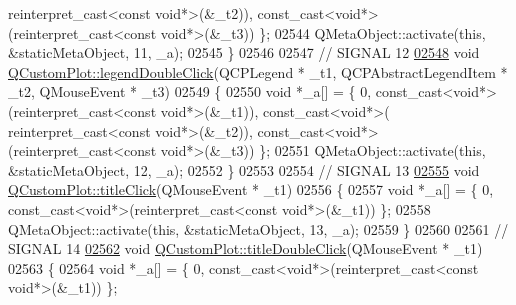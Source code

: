 \begin{DoxyCode}
{      reinterpret\_cast<}\textcolor{keyword}{const }\textcolor{keywordtype}{void}*\textcolor{keyword}{>}(&\_t2)), \textcolor{keyword}{const\_cast<}\textcolor{keywordtype}{void}*\textcolor{keyword}{>}(\textcolor{keyword}{reinterpret\_cast<}\textcolor{keyword}{const }\textcolor{keywordtype}{void}*\textcolor{keyword}{>}(&\_t3)) \};
02544     QMetaObject::activate(\textcolor{keyword}{this}, &staticMetaObject, 11, \_a);
02545 \}
02546 
02547 \textcolor{comment}{// SIGNAL 12}
\hypertarget{a00067_source_l02548}{}\hyperlink{a00116_a0250f835c044521df1619b132288bca7}{02548} \textcolor{keywordtype}{void} \hyperlink{a00116_a0250f835c044521df1619b132288bca7}{QCustomPlot::legendDoubleClick}(QCPLegend * \_t1, QCPAbstractLegendItem * 
      \_t2, QMouseEvent * \_t3)
02549 \{
02550     \textcolor{keywordtype}{void} *\_a[] = \{ 0, \textcolor{keyword}{const\_cast<}\textcolor{keywordtype}{void}*\textcolor{keyword}{>}(\textcolor{keyword}{reinterpret\_cast<}\textcolor{keyword}{const }\textcolor{keywordtype}{void}*\textcolor{keyword}{>}(&\_t1)), \textcolor{keyword}{const\_cast<}\textcolor{keywordtype}{void}*\textcolor{keyword}{>}(\textcolor{keyword}{
      reinterpret\_cast<}\textcolor{keyword}{const }\textcolor{keywordtype}{void}*\textcolor{keyword}{>}(&\_t2)), \textcolor{keyword}{const\_cast<}\textcolor{keywordtype}{void}*\textcolor{keyword}{>}(\textcolor{keyword}{reinterpret\_cast<}\textcolor{keyword}{const }\textcolor{keywordtype}{void}*\textcolor{keyword}{>}(&\_t3)) \};
02551     QMetaObject::activate(\textcolor{keyword}{this}, &staticMetaObject, 12, \_a);
02552 \}
02553 
02554 \textcolor{comment}{// SIGNAL 13}
\hypertarget{a00067_source_l02555}{}\hyperlink{a00116_a969beb5e4b7e8864e5e349fcda4ce45b}{02555} \textcolor{keywordtype}{void} \hyperlink{a00116_a969beb5e4b7e8864e5e349fcda4ce45b}{QCustomPlot::titleClick}(QMouseEvent * \_t1)
02556 \{
02557     \textcolor{keywordtype}{void} *\_a[] = \{ 0, \textcolor{keyword}{const\_cast<}\textcolor{keywordtype}{void}*\textcolor{keyword}{>}(\textcolor{keyword}{reinterpret\_cast<}\textcolor{keyword}{const }\textcolor{keywordtype}{void}*\textcolor{keyword}{>}(&\_t1)) \};
02558     QMetaObject::activate(\textcolor{keyword}{this}, &staticMetaObject, 13, \_a);
02559 \}
02560 
02561 \textcolor{comment}{// SIGNAL 14}
\hypertarget{a00067_source_l02562}{}\hyperlink{a00116_a854db02b12e8df49b5f998f17e8ee770}{02562} \textcolor{keywordtype}{void} \hyperlink{a00116_a854db02b12e8df49b5f998f17e8ee770}{QCustomPlot::titleDoubleClick}(QMouseEvent * \_t1)
02563 \{
02564     \textcolor{keywordtype}{void} *\_a[] = \{ 0, \textcolor{keyword}{const\_cast<}\textcolor{keywordtype}{void}*\textcolor{keyword}{>}(\textcolor{keyword}{reinterpret\_cast<}\textcolor{keyword}{const }\textcolor{keywordtype}{void}*\textcolor{keyword}{>}(&\_t1)) \};

\end{DoxyCode}
